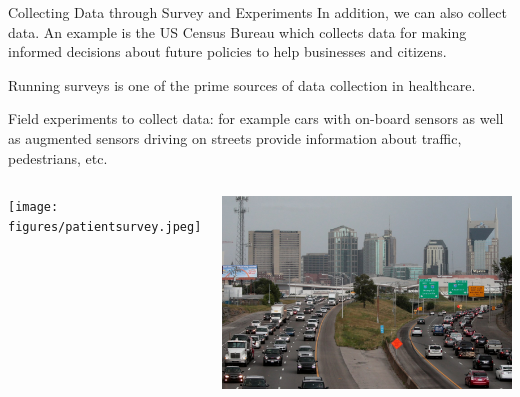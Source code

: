 \documentclass[aspectratio=169,xcolor=dvipsnames,svgnames,x11names,fleqn]{beamer}
\begin{document}
\begin{frame}{Collecting Data through Survey and Experiments}
    In addition, we can also collect data. An example is the US Census Bureau which collects data for making informed decisions about future policies to help businesses and citizens.

    \begin{gradblock}{}
        Running surveys is one of the prime sources of data collection in healthcare.
    \end{gradblock}
     \begin{gradblock}{}
        Field experiments to collect data: for example cars with on-board sensors as well as augmented sensors driving on streets provide information about traffic, pedestrians, etc.
    \end{gradblock}

      \begin{columns}[c] %

        \texttt{[image: figures/patientsurvey.jpeg]}

        \includegraphics[width=.9\textwidth]{figures/traffic.jpeg}

    \end{columns}
    \end{frame}


\end{document}
